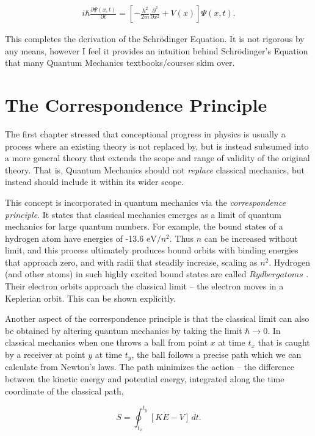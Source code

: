 \begin{align} \label{eq: 1D Schrodinger Equation}
  i\hbar \frac{\partial \Psi(x, t)}{\partial t} = \left[ -\frac{\hbar^2}{2m}
  \frac{\partial^2 }{\partial x^2} + V(x) \right] \Psi(x, t). 
\end{align}

This completes the derivation of the Schr\"odinger Equation. It is not rigorous
by any means, however I feel it provides an intuition behind Schr\"odinger's
Equation that many Quantum Mechanics textbooks/courses skim over.

\twocolumn
\section{The Correspondence Principle}

The first chapter stressed that conceptional progress in physics is usually
a process where an existing theory is not replaced by, but is instead subsumed
into a more general theory that extends the scope and range of validity of the
original theory. That is, Quantum Mechanics should not \textit{replace}
classical mechanics, but instead should include it within its wider scope.

This concept is incorporated in quantum mechanics via the
\textit{correspondence principle}. It states that classical mechanics emerges
as a limit of quantum mechanics for large quantum numbers. 
For example, the bound states of a hydrogen atom have energies
of -13.6 $\text{eV} /n^2$. Thus $n$ can be increased without limit, and this
process ultimately produces bound orbits with binding energies that approach
zero, and with radii that steadily increase, scaling as $n^2$. Hydrogen (and
other atoms) in such highly excited bound states are called $Rydberg atoms$
. Their electron orbits approach the classical limit -- the electron moves in
a Keplerian orbit. This can be shown explicitly. 

Another aspect of the correspondence principle is that the classical limit can
also be obtained by altering quantum mechanics by taking the limit $\hbar
\rightarrow  0$. In classical mechanics when one throws a ball from point $x$
at time $t_x$ that is caught by a receiver at point $y$ at time $t_y$, the ball
follows a precise path which we can calculate from Newton's laws. The path
minimizes the action -- the difference between the kinetic energy and potential
energy, integrated along the time coordinate of the classical path, 

\[
  S = \oint_{t_x}^{t_y} [KE - V]\, dt.
\] \vspace{3px}

